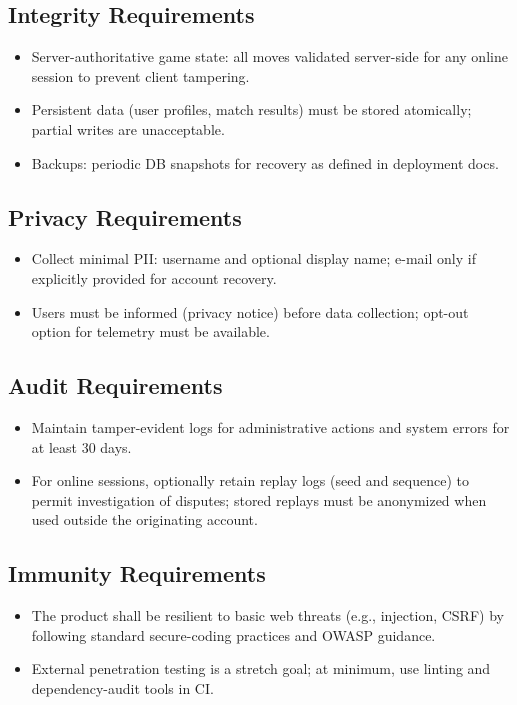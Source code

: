 \documentclass[12pt]{article}
\begin{document}
\subsection{Integrity Requirements}
\begin{itemize}
  \item Server-authoritative game state: all moves validated server-side for any online session to prevent client tampering.
  \item Persistent data (user profiles, match results) must be stored atomically; partial writes are unacceptable.
  \item Backups: periodic DB snapshots for recovery as defined in deployment docs.
\end{itemize}

\subsection{Privacy Requirements}
\begin{itemize}
  \item Collect minimal PII: username and optional display name; e-mail only if explicitly provided for account recovery.
  \item Users must be informed (privacy notice) before data collection; opt-out option for telemetry must be available.
\end{itemize}

\subsection{Audit Requirements}
\begin{itemize}
  \item Maintain tamper-evident logs for administrative actions and system errors for at least 30 days.
  \item For online sessions, optionally retain replay logs (seed and sequence) to permit investigation of disputes; stored replays must be anonymized when used outside the originating account.
\end{itemize}

\subsection{Immunity Requirements}
\begin{itemize}
  \item The product shall be resilient to basic web threats (e.g., injection, CSRF) by following standard secure-coding practices and OWASP guidance.
  \item External penetration testing is a stretch goal; at minimum, use linting and dependency-audit tools in CI.
\end{itemize}
\end{document}
